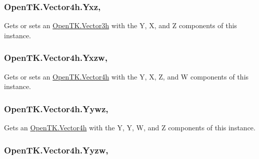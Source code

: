 \hypertarget{struct_open_t_k_1_1_vector4h_ab892c33ba866ad9e03760bd1d1628d84}{
\subsubsection[{Yxz}]{ Open\-T\-K.\-Vector4h.\-Yxz\hspace{0.3cm}{\ttfamily [get]}, {\ttfamily [set]}}}\label{struct_open_t_k_1_1_vector4h_ab892c33ba866ad9e03760bd1d1628d84}


Gets or sets an \hyperlink{struct_open_t_k_1_1_vector3h}{Open\-T\-K.\-Vector3h} with the Y, X, and Z components of this instance. 

\hypertarget{struct_open_t_k_1_1_vector4h_ad39dbbe238a08e80ad905dee0efdacad}{
\subsubsection[{Yxzw}]{ Open\-T\-K.\-Vector4h.\-Yxzw\hspace{0.3cm}{\ttfamily [get]}, {\ttfamily [set]}}}\label{struct_open_t_k_1_1_vector4h_ad39dbbe238a08e80ad905dee0efdacad}


Gets or sets an \hyperlink{struct_open_t_k_1_1_vector4h}{Open\-T\-K.\-Vector4h} with the Y, X, Z, and W components of this instance. 

\hypertarget{struct_open_t_k_1_1_vector4h_a8630663753c0ac0662e433e0eca71ad8}{
\subsubsection[{Yywz}]{ Open\-T\-K.\-Vector4h.\-Yywz\hspace{0.3cm}{\ttfamily [get]}, {\ttfamily [set]}}}\label{struct_open_t_k_1_1_vector4h_a8630663753c0ac0662e433e0eca71ad8}


Gets an \hyperlink{struct_open_t_k_1_1_vector4h}{Open\-T\-K.\-Vector4h} with the Y, Y, W, and Z components of this instance. 

\hypertarget{struct_open_t_k_1_1_vector4h_a729e5aae17bcbe9d07018ae47e61f1fb}{
\subsubsection[{Yyzw}]{ Open\-T\-K.\-Vector4h.\-Yyzw\hspace{0.3cm}{\ttfamily [get]}, {\ttfamily [set]}}}\label{struct_open_t_k_1_1_vector4h_a729e5aae17bcbe9d07018ae47e61f1fb}



